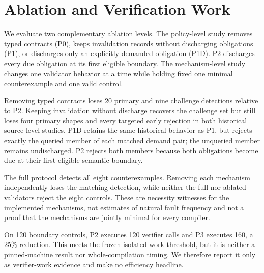 \section{Ablation and Verification Work}
We evaluate two complementary ablation levels. The policy-level study removes typed contracts (P0), keeps invalidation records without discharging obligations (P1), or discharges only an explicitly demanded obligation (P1D). P2 discharges every due obligation at its first eligible boundary. The mechanism-level study changes one validator behavior at a time while holding fixed one minimal counterexample and one valid control.

\begin{table}[t]
\caption{Policy-level ablation. ``Hist. W/T'' are the historical System W and TensorRules faults; ``Demand W/T'' are matched queried/unqueried demand cases. The table is regenerated from validated evidence and byte-compared in CI.}
\label{tab:policy-ablation}
\scriptsize
\centering

\end{table}

Removing typed contracts loses 20 primary and nine challenge detections relative to P2. Keeping invalidation without discharge recovers the challenge set but still loses four primary shapes and every targeted early rejection in both historical source-level studies. P1D retains the same historical behavior as P1, but rejects exactly the queried member of each matched demand pair; the unqueried member remains undischarged. P2 rejects both members because both obligations become due at their first eligible semantic boundary.

\begin{table}[t]
\caption{Eight isolated mechanism ablations. ``Full'' and ``Ablated'' report detection of the corresponding minimal counterexample; ``Control FP'' reports rejection of its valid control by the ablated validator. The table is evidence-generated and byte-compared in CI.}
\label{tab:mechanism-ablation}
\scriptsize
\centering

\end{table}

The full protocol detects all eight counterexamples. Removing each mechanism independently loses the matching detection, while neither the full nor ablated validators reject the eight controls. These are necessity witnesses for the implemented mechanisms, not estimates of natural fault frequency and not a proof that the mechanisms are jointly minimal for every compiler.

On 120 boundary controls, P2 executes 120 verifier calls and P3 executes 160, a 25\% reduction. This meets the frozen isolated-work threshold, but it is neither a pinned-machine result nor whole-compilation timing. We therefore report it only as verifier-work evidence and make no efficiency headline.
